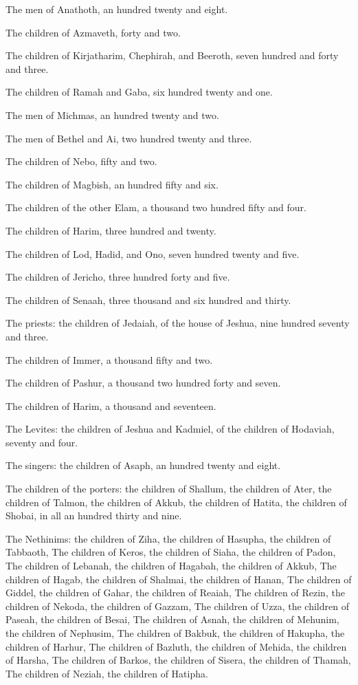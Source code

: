 \verse The men of Anathoth, an hundred twenty and eight.

\verse The children of Azmaveth, forty and two.

\verse The children of Kirjatharim, Chephirah, and Beeroth, seven hundred and forty and three.

\verse The children of Ramah and Gaba, six hundred twenty and one.

\verse The men of Michmas, an hundred twenty and two.

\verse The men of Bethel and Ai, two hundred twenty and three.

\verse The children of Nebo, fifty and two.

\verse The children of Magbish, an hundred fifty and six.

\verse The children of the other Elam, a thousand two hundred fifty and four.

\verse The children of Harim, three hundred and twenty.

\verse The children of Lod, Hadid, and Ono, seven hundred twenty and five.

\verse The children of Jericho, three hundred forty and five.

\verse The children of Senaah, three thousand and six hundred and thirty.

\verse The priests: the children of Jedaiah, of the house of Jeshua, nine hundred seventy and three.

\verse The children of Immer, a thousand fifty and two.

\verse The children of Pashur, a thousand two hundred forty and seven.

\verse The children of Harim, a thousand and seventeen.

\verse The Levites: the children of Jeshua and Kadmiel, of the children of Hodaviah, seventy and four.

\verse The singers: the children of Asaph, an hundred twenty and eight.

\verse The children of the porters: the children of Shallum, the children of Ater, the children of Talmon, the children of Akkub, the children of Hatita, the children of Shobai, in all an hundred thirty and nine.

\verse The Nethinims: the children of Ziha, the children of Hasupha, the children of Tabbaoth, \verse The children of Keros, the children of Siaha, the children of Padon, \verse The children of Lebanah, the children of Hagabah, the children of Akkub, \verse The children of Hagab, the children of Shalmai, the children of Hanan, \verse The children of Giddel, the children of Gahar, the children of Reaiah, \verse The children of Rezin, the children of Nekoda, the children of Gazzam, \verse The children of Uzza, the children of Paseah, the children of Besai, \verse The children of Asnah, the children of Mehunim, the children of Nephusim, \verse The children of Bakbuk, the children of Hakupha, the children of Harhur, \verse The children of Bazluth, the children of Mehida, the children of Harsha, \verse The children of Barkos, the children of Sisera, the children of Thamah, \verse The children of Neziah, the children of Hatipha.

